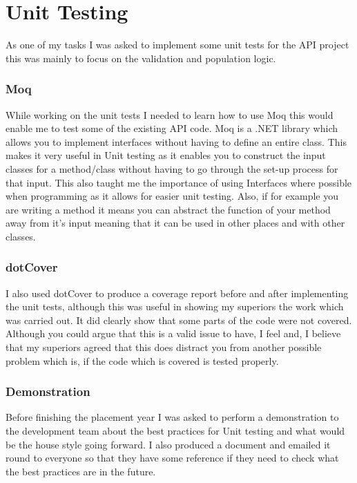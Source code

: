 \section{Unit Testing}{
	As one of my tasks I was asked to implement some unit tests for the API project this was mainly to focus on the validation and population logic. 
	\subsubsection*{Moq}{
		While working on the unit tests I needed to learn how to use Moq this would enable me to test some of the existing API code. Moq is a .NET library which allows you to implement interfaces without having to define an entire class. This makes it very useful in Unit testing as it enables you to construct the input classes for a method/class without having to go through the set-up process for that input. This also taught me the importance of using Interfaces where possible when programming as it allows for easier unit testing. Also, if for example you are writing a method it means you can abstract the function of your method away from it's input meaning that it can be used in other places \textsl{}and with other classes.
	}
	\subsubsection*{dotCover}{
	I also used dotCover\cite{dotCover2018} to produce a coverage report before and after implementing the unit tests, although this was useful in showing my superiors the work which was carried out. It did clearly show that some parts of the code were not covered. Although you could argue that this is a valid issue to have, I feel and, I believe that my superiors agreed that this does distract you from another possible problem which is, if the code which is covered is tested properly.
	} 
	\subsubsection*{Demonstration}{
		Before finishing the placement year I was asked to perform a demonstration to the development team about the best practices for Unit testing and what would be the house style going forward. I also produced a document and emailed it round to everyone so that they have some reference if they need to check what the best practices are in the future.
	}
	
}
